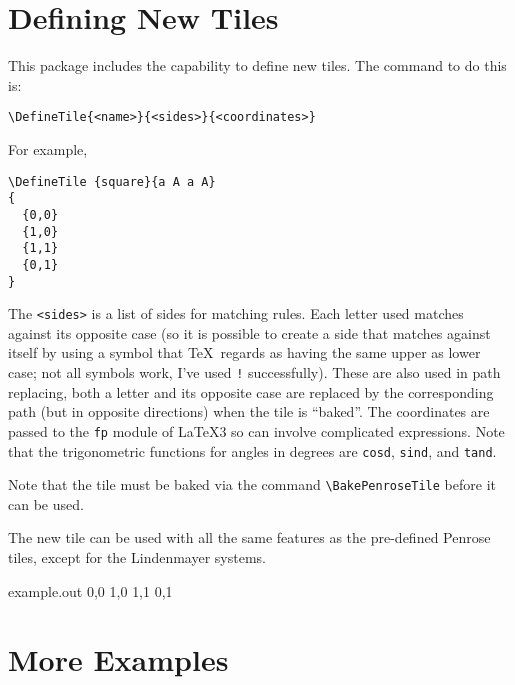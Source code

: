 \documentclass{ltxdoc}
\newenvironment{example}
  {\VerbatimEnvironment
   \begin{VerbatimOut}{example.out}}
  {\end{VerbatimOut}
   \begin{center}
   \setlength{\parindent}{0pt}
   \fbox{\begin{minipage}{.9\linewidth}
     \lstset{breakatwhitespace=true,breaklines=true,language=TeX,basicstyle=\small}
     
   \end{minipage}}

   \fbox{\begin{minipage}{.9\linewidth}
     \centering
     
   \end{minipage}}
\end{center}
}
\begin{document}
\section{Defining New Tiles}

This package includes the capability to define new tiles.
The command to do this is:
%
\begin{verbatim}
\DefineTile{<name>}{<sides>}{<coordinates>}
\end{verbatim}
%
For example,
%
\begin{verbatim}
\DefineTile {square}{a A a A}
{
  {0,0}
  {1,0}
  {1,1}
  {0,1}
}
\end{verbatim}
%
The \Verb!<sides>! is a list of sides for matching rules.
Each letter used matches against its opposite case (so it is possible to create a side that matches against itself by using a symbol that \TeX\ regards as having the same upper as lower case; not all symbols work, I've used \Verb+!+ successfully).
These are also used in path replacing, both a letter and its opposite case are replaced by the corresponding path (but in opposite directions) when the tile is ``baked''.
The coordinates are passed to the \Verb!fp! module of \LaTeX3 so can involve complicated expressions.
Note that the trigonometric functions for angles in degrees are \Verb!cosd!, \Verb!sind!, and \Verb!tand!.

Note that the tile must be baked via the command \Verb!\BakePenroseTile! before it can be used.

The new tile can be used with all the same features as the pre-defined Penrose tiles, except for the Lindenmayer systems. 

\begin{example}
{
  {0,0}
  {1,0}
  {1,1}
  {0,1}
}
\end{example}

\section{More Examples}
\end{document}
